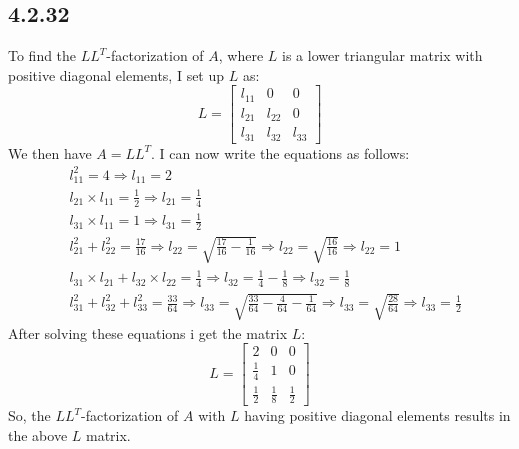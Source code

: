\documentclass[manuscript,screen,review]{acmart}
\begin{document}
\subsection*{4.2.32}
To find the $L L^T$-factorization of $A$, where $L$ is a lower triangular matrix with positive diagonal elements, I set up $L$ as:
$$
L=\left[\begin{array}{ccc}
l_{11} & 0 & 0 \\
l_{21} & l_{22} & 0 \\
l_{31} & l_{32} & l_{33}
\end{array}\right]
$$
We then have $A=L L^T$. I can now write the equations as follows:
$$
\begin{aligned}
& l_{11}^2=4 \Rightarrow l_{11}=2 \\
& l_{21} \times l_{11}=\frac{1}{2} \Rightarrow l_{21}=\frac{1}{4} \\
& l_{31} \times l_{11}=1 \Rightarrow l_{31}=\frac{1}{2} \\
& l_{21}^2+l_{22}^2=\frac{17}{16} \Rightarrow l_{22}=\sqrt{\frac{17}{16}-\frac{1}{16}} \Rightarrow l_{22}=\sqrt{\frac{16}{16}} \Rightarrow l_{22}=1 \\
& l_{31} \times l_{21}+l_{32} \times l_{22}=\frac{1}{4} \Rightarrow l_{32}=\frac{1}{4}-\frac{1}{8} \Rightarrow l_{32}=\frac{1}{8} \\
& l_{31}^2+l_{32}^2+l_{33}^2=\frac{33}{64} \Rightarrow l_{33}=\sqrt{\frac{33}{64}-\frac{4}{64}-\frac{1}{64}} \Rightarrow l_{33}=\sqrt{\frac{28}{64}} \Rightarrow l_{33}=\frac{1}{2}
\end{aligned}
$$
After solving these equations i get the matrix $L$:
$$
L=\left[\begin{array}{ccc}
2 & 0 & 0 \\
\frac{1}{4} & 1 & 0 \\
\frac{1}{2} & \frac{1}{8} & \frac{1}{2}
\end{array}\right]
$$
So, the $L L^T$-factorization of $A$ with $L$ having positive diagonal elements results in the above $L$ matrix.
\end{document}
